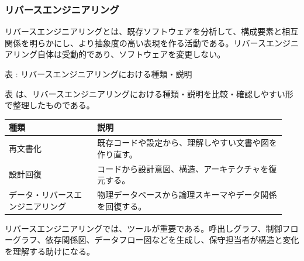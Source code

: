 \subsubsection{リバースエンジニアリング}
リバースエンジニアリングとは、既存ソフトウェアを分析して、構成要素と相互関係を明らかにし、より抽象度の高い表現を作る活動である。リバースエンジニアリング自体は受動的であり、ソフトウェアを変更しない。\par
\par\smallskip\noindent{}\label{tab:ch07-12}表 \thetable: リバースエンジニアリングにおける種類・説明\par\smallskip
表 \thetable は、リバースエンジニアリングにおける種類・説明を比較・確認しやすい形で整理したものである。\par\smallskip
\begin{longtable}{p{0.30\linewidth}p{0.64\linewidth}}
\toprule
種類 & 説明 \\
\midrule
\endhead
再文書化 & 既存コードや設定から、理解しやすい文書や図を作り直す。 \\
設計回復 & コードから設計意図、構造、アーキテクチャを復元する。 \\
データ・リバースエンジニアリング & 物理データベースから論理スキーマやデータ関係を回復する。 \\
\bottomrule
\end{longtable}
リバースエンジニアリングでは、ツールが重要である。呼出しグラフ、制御フローグラフ、依存関係図、データフロー図などを生成し、保守担当者が構造と変化を理解する助けになる。\par
